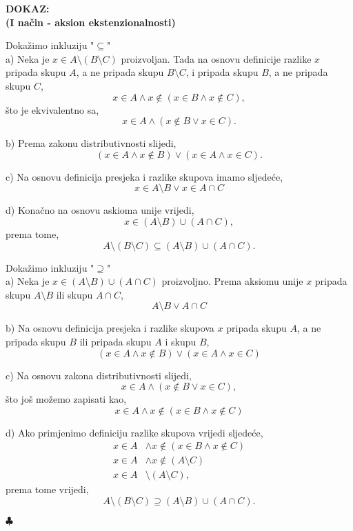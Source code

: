 \documentclass{article}
\newenvironment{dokaz}
    {\noindent\textbf{DOKAZ:}\\} {\hfill $\clubsuit$}
\begin{document}
\begin{dokaz}

    \noindent\textbf{(I način - aksion ekstenzionalnosti)}
    \smallskip

    \noindent
        Dokažimo inkluziju "$\subseteq $"\\
        a) Neka je $x\in A\setminus (B\setminus C)$ proizvoljan. Tada na osnovu definicije razlike $x$ pripada skupu $A$, a ne pripada skupu $B\setminus C$, i pripada skupu $B$, a ne pripada skupu $C$,
        $$x\in A\land x\notin (x\in B\land x\notin C),$$
        što je ekvivalentno sa,
        $$x\in A\land (x\notin B\vee x\in C).$$
        \smallskip

        \noindent
        b) Prema zakonu distributivnosti slijedi,
        $$(x\in A\land x\notin B)\vee (x\in A\land x\in C).$$
        \smallskip

        \noindent
        c) Na osnovu definicija presjeka i razlike skupova imamo sljedeće,
        $$x\in A\setminus B\vee x\in A\cap C$$
        \smallskip

        \noindent
        d) Konačno na osnovu askioma unije vrijedi,
        $$x\in (A\setminus B)\cup (A\cap C),$$
        prema tome,
        \begin{equation}
            A\setminus (B\setminus C)\subseteq (A\setminus B)\cup (A\cap C).\label{eq:4}
        \end{equation}
        \bigskip

        \noindent
        Dokažimo inkluziju "$\supseteq $"\\
        a) Neka je $x\in (A\setminus B)\cup (A\cap C)$ proizvoljno. Prema aksiomu unije $x$ pripada skupu $A\setminus B$ ili skupu $A\cap C$,
        $$A\setminus B\vee A\cap C$$
        \smallskip

        \noindent
        b) Na osnovu definicija presjeka i razlike skupova $x$ pripada skupu $A$, a ne pripada skupu $B$ ili pripada skupu $A$ i skupu $B$,
        $$(x\in A\land x\notin B)\vee (x\in A\land x\in C)$$
        \smallskip

        \noindent
        c) Na osnovu zakona distributivnosti slijedi,
        $$x\in A\land (x\notin B\vee x\in C),$$
        što još možemo zapisati kao,
        $$x\in A\land x\notin (x\in B\land x\notin C)$$
        \smallskip

        \newpage\noindent\thispagestyle{empty}
        d) Ako primjenimo definiciju razlike skupova vrijedi sljedeće,
        \begin{align*}
            x\in A &\land x\notin (x\in B\land x\notin C)\\
            x\in A &\land x\notin(A\setminus C)\\
            x\in A &\setminus (A\setminus C),
        \end{align*}
        prema tome vrijedi,
        \begin{equation}
            A\setminus (B\setminus C)\supseteq (A\setminus B)\cup (A\cap C).\label{eq:5}
        \end{equation}
        \medskip


\end{dokaz}
\end{document}
